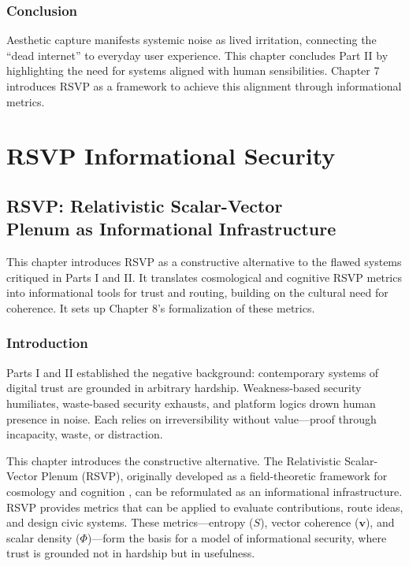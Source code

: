 \documentclass[openany]{book}
\begin{document}
\section{Conclusion}

Aesthetic capture manifests systemic noise as lived irritation, connecting the ``dead internet'' to everyday user experience. This chapter concludes Part II by highlighting the need for systems aligned with human sensibilities. Chapter 7 introduces RSVP as a framework to achieve this alignment through informational metrics.

\part{RSVP Informational Security}

\chapter{RSVP: Relativistic Scalar-Vector\\ Plenum as Informational Infrastructure}

This chapter introduces RSVP as a constructive alternative to the flawed systems critiqued in Parts I and II. It translates cosmological and cognitive RSVP metrics into informational tools for trust and routing, building on the cultural need for coherence. It sets up Chapter 8’s formalization of these metrics.

\section{Introduction}

Parts I and II established the negative background: contemporary systems of digital trust are grounded in arbitrary hardship. Weakness-based security humiliates, waste-based security exhausts, and platform logics drown human presence in noise. Each relies on irreversibility without value---proof through incapacity, waste, or distraction.

This chapter introduces the constructive alternative. The Relativistic Scalar-Vector Plenum (RSVP), originally developed as a field-theoretic framework for cosmology and cognition \cite{prigogine1984}, can be reformulated as an informational infrastructure. RSVP provides metrics that can be applied to evaluate contributions, route ideas, and design civic systems. These metrics---entropy ($S$), vector coherence ($\mathbf{v}$), and scalar density ($\Phi$)---form the basis for a model of informational security, where trust is grounded not in hardship but in usefulness.
\end{document}
